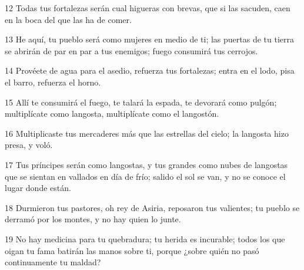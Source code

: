 \par 12 Todas tus fortalezas serán cual higueras con brevas, que si las sacuden, caen en la boca del que las ha de comer.
\par 13 He aquí, tu pueblo será como mujeres en medio de ti; las puertas de tu tierra se abrirán de par en par a tus enemigos; fuego consumirá tus cerrojos.
\par 14 Provéete de agua para el asedio, refuerza tus fortalezas; entra en el lodo, pisa el barro, refuerza el horno.
\par 15 Allí te consumirá el fuego, te talará la espada, te devorará como pulgón; multiplícate como langosta, multiplícate como el langostón.
\par 16 Multiplicaste tus mercaderes más que las estrellas del cielo; la langosta hizo presa, y voló.
\par 17 Tus príncipes serán como langostas, y tus grandes como nubes de langostas que se sientan en vallados en día de frío; salido el sol se van, y no se conoce el lugar donde están.
\par 18 Durmieron tus pastores, oh rey de Asiria, reposaron tus valientes; tu pueblo se derramó por los montes, y no hay quien lo junte.
\par 19 No hay medicina para tu quebradura; tu herida es incurable; todos los que oigan tu fama batirán las manos sobre ti, porque ¿sobre quién no pasó continuamente tu maldad?

